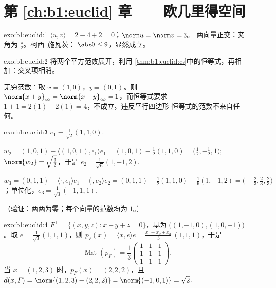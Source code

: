 \section*{第 \ref{ch:b1:euclid} 章——欧几里得空间}

\begin{solution}{exo:b1:euclid:1}
$\langle u, v\rangle = 2 - 4 + 2 = 0$；$\norm u = \norm v = 3$。
两向量正交：夹角为 $\frac\pi2$。柯西–施瓦茨：
$\abs 0 \leq 9$，显然成立。
\end{solution}

\begin{solution}{exo:b1:euclid:2}
将两个平方范数展开，利用
\cref{thm:b1:euclid:cs}中的恒等式，再相加：交叉项相消。

无穷范数：取 $x = (1, 0)$，$y = (0, 1)$。则 $\norm{x + y}_\infty
= \norm{x - y}_\infty = 1$，而恒等式要求 $1 + 1 =
2(1) + 2(1) = 4$，不成立。违反平行四边形
恒等式的范数不来自任何。
\end{solution}

\begin{solution}{exo:b1:euclid:3}
$e_1 = \frac{1}{\sqrt 2}(1,1,0)$.

$w_2 = (1,0,1) - \langle (1,0,1), e_1\rangle e_1 = (1,0,1) -
\frac{1}{2}(1,1,0) = \bigl(\tfrac12, -\tfrac12, 1\bigr)$;
$\norm{w_2} = \sqrt{\tfrac32}$，于是 $e_2 =
\frac{1}{\sqrt 6}(1, -1, 2)$.

$w_3 = (0,1,1) - \langle\cdot, e_1\rangle e_1 - \langle\cdot,
e_2\rangle e_2 = (0,1,1) - \frac12 (1,1,0) - \frac16(1,-1,2) =
\bigl(-\tfrac23, \tfrac23, \tfrac23\bigr)$；单位化，$e_3 =
\frac{1}{\sqrt 3}(-1, 1, 1)$.

（验证：两两为零；每个向量的范数均为 $1$。）
\end{solution}

\begin{solution}{exo:b1:euclid:4}
$F^\perp = \{(x,y,z) : x + y + z = 0\}$，基为 $\bigl((1,-1,0),
(1,0,-1)\bigr)$。取 $e = \frac{1}{\sqrt3}(1,1,1)$，则 $p_F(x) =
\langle x, e\rangle e = \frac{x_1 + x_2 + x_3}{3}\,(1,1,1)$，于是
\[
\operatorname{Mat}(p_F) = \frac13
\begin{pmatrix} 1&1&1\\ 1&1&1\\ 1&1&1\end{pmatrix}.
\]
当 $x = (1,2,3)$ 时，$p_F(x) = (2,2,2)$，且 $d(x, F) = \norm{(1,2,3)
- (2,2,2)} = \norm{(-1,0,1)} = \sqrt 2$.
\end{solution}

